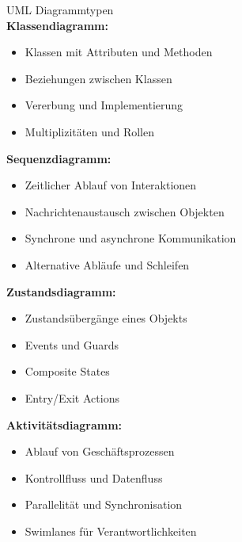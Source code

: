 \begin{concept}{UML Diagrammtypen}\\
\textbf{Klassendiagramm:}
\begin{itemize}
    \item Klassen mit Attributen und Methoden
    \item Beziehungen zwischen Klassen
    \item Vererbung und Implementierung
    \item Multiplizitäten und Rollen
\end{itemize}

\textbf{Sequenzdiagramm:}
\begin{itemize}
    \item Zeitlicher Ablauf von Interaktionen
    \item Nachrichtenaustausch zwischen Objekten
    \item Synchrone und asynchrone Kommunikation
    \item Alternative Abläufe und Schleifen
\end{itemize}

\textbf{Zustandsdiagramm:}
\begin{itemize}
    \item Zustandsübergänge eines Objekts
    \item Events und Guards
    \item Composite States
    \item Entry/Exit Actions
\end{itemize}

\textbf{Aktivitätsdiagramm:}
\begin{itemize}
    \item Ablauf von Geschäftsprozessen
    \item Kontrollfluss und Datenfluss
    \item Parallelität und Synchronisation
    \item Swimlanes für Verantwortlichkeiten
\end{itemize}
\end{concept}

